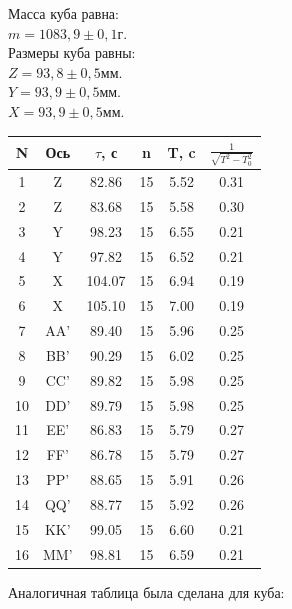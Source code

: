 \documentclass[12pt, a4paper]{article}
\begin{document}
		
		Масса куба равна: \\
		$m = 1083,9 \pm 0,1$г. \\
		Размеры куба равны: \\
		$Z = 93,8 \pm 0,5$мм. \\
		$Y = 93,9 \pm 0,5$мм. \\
		$X = 93,9 \pm 0,5$мм. 
		\begin{center}
            \begin{tabular}{ | c | c | c | c | c | c | }
                \hline
                N & Ось & $\tau$, с & n & T, c & $\frac{1}{\sqrt{T^2-T_0^2}}$ \\ \hline
                1 & Z & 82.86 & 15 & 5.52 & 0.31 \\ \hline
                2 & Z & 83.68 & 15 & 5.58 & 0.30 \\ \hline
                3 & Y & 98.23 & 15 & 6.55 & 0.21 \\ \hline
                4 & Y & 97.82 & 15 & 6.52 & 0.21 \\ \hline
				5 & X & 104.07 & 15 & 6.94 & 0.19 \\ \hline
				6 & X & 105.10 & 15 & 7.00 & 0.19 \\ \hline
				7 & AA' & 89.40 & 15 & 5.96 & 0.25 \\ \hline
				8 & BB' & 90.29 & 15 & 6.02 & 0.25 \\ \hline
				9 & CC' & 89.82 & 15 & 5.98 & 0.25 \\ \hline
				10 & DD' & 89.79 & 15 & 5.98 & 0.25 \\ \hline
				11 & EE' & 86.83 & 15 & 5.79 & 0.27 \\ \hline
				12 & FF' & 86.78 & 15 & 5.79 & 0.27 \\ \hline
				13 & PP' & 88.65 & 15 & 5.91 & 0.26 \\ \hline
				14 & QQ' & 88.77 & 15 & 5.92 & 0.26 \\ \hline
				15 & KK' & 99.05 & 15 & 6.60 & 0.21 \\ \hline
				16 & MM' & 98.81 & 15 & 6.59 & 0.21 \\ \hline
            \end{tabular}
            \end{center} 
		

			Аналогичная таблица была сделана для куба:
\end{document}
